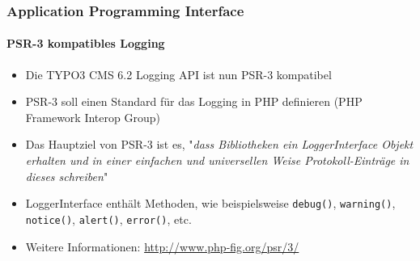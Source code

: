 \begin{frame}[fragile]
	\frametitle{Application Programming Interface}
	\framesubtitle{PSR-3 kompatibles Logging}

	\begin{itemize}
		\item Die TYPO3 CMS 6.2 Logging API ist nun PSR-3 kompatibel
		\item PSR-3 soll einen Standard für das Logging in PHP definieren\newline
			(PHP Framework Interop Group)

		\item Das Hauptziel von PSR-3 ist es,
			"\emph{dass Bibliotheken ein LoggerInterface Objekt erhalten und in einer einfachen und universellen Weise Protokoll-Einträge in dieses schreiben}"

		\item LoggerInterface enthält Methoden, wie beispielsweise\newline
			\texttt{debug()}, \texttt{warning()}, \texttt{notice()}, \texttt{alert()}, \texttt{error()}, etc.

		\item Weitere Informationen:\newline
			\url{http://www.php-fig.org/psr/3/}

	\end{itemize}

\end{frame}


